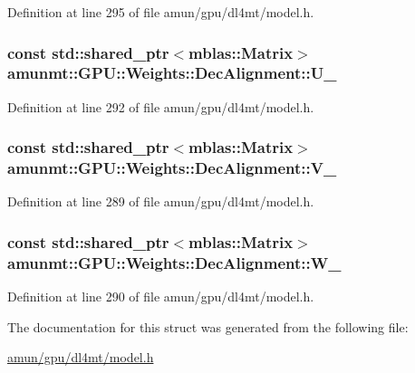 Definition at line 295 of file amun/gpu/dl4mt/model.\+h.

\subsubsection[{\texorpdfstring{U\+\_\+}{U_}}]{\setlength{\rightskip}{0pt plus 5cm}const std\+::shared\+\_\+ptr$<${\bf mblas\+::\+Matrix}$>$ amunmt\+::\+G\+P\+U\+::\+Weights\+::\+Dec\+Alignment\+::\+U\+\_\+}\hypertarget{structamunmt_1_1GPU_1_1Weights_1_1DecAlignment_a7e119604736681821ea48cbc50154511}{}\label{structamunmt_1_1GPU_1_1Weights_1_1DecAlignment_a7e119604736681821ea48cbc50154511}


Definition at line 292 of file amun/gpu/dl4mt/model.\+h.

\subsubsection[{\texorpdfstring{V\+\_\+}{V_}}]{\setlength{\rightskip}{0pt plus 5cm}const std\+::shared\+\_\+ptr$<${\bf mblas\+::\+Matrix}$>$ amunmt\+::\+G\+P\+U\+::\+Weights\+::\+Dec\+Alignment\+::\+V\+\_\+}\hypertarget{structamunmt_1_1GPU_1_1Weights_1_1DecAlignment_a9af90c7f1194d739a6f015e8d93fb109}{}\label{structamunmt_1_1GPU_1_1Weights_1_1DecAlignment_a9af90c7f1194d739a6f015e8d93fb109}


Definition at line 289 of file amun/gpu/dl4mt/model.\+h.

\subsubsection[{\texorpdfstring{W\+\_\+}{W_}}]{\setlength{\rightskip}{0pt plus 5cm}const std\+::shared\+\_\+ptr$<${\bf mblas\+::\+Matrix}$>$ amunmt\+::\+G\+P\+U\+::\+Weights\+::\+Dec\+Alignment\+::\+W\+\_\+}\hypertarget{structamunmt_1_1GPU_1_1Weights_1_1DecAlignment_a7fe1c5f67b1350cde0dd5ab80120dbe1}{}\label{structamunmt_1_1GPU_1_1Weights_1_1DecAlignment_a7fe1c5f67b1350cde0dd5ab80120dbe1}


Definition at line 290 of file amun/gpu/dl4mt/model.\+h.



The documentation for this struct was generated from the following file\+:\begin{DoxyCompactItemize}
\item 
\hyperlink{amun_2gpu_2dl4mt_2model_8h}{amun/gpu/dl4mt/model.\+h}\end{DoxyCompactItemize}
